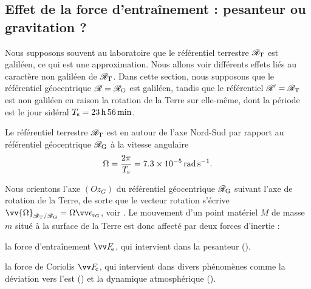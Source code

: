 \documentclass[12pt,fancy]{cours}
\begin{document}
\subsection{Effet de la force d'entraînement : pesanteur ou gravitation ?}
\label{sec:pesanteur_gravité}

Nous supposons souvent au laboratoire que le référentiel terrestre $\mathcal{R}_{\rm T}$ est galiléen, ce qui est une approximation. Nous allons voir différents effets liés au caractère non galiléen de $\mathcal{R}_{\rm T}$. Dans cette section, nous supposons que le référentiel géocentrique $\mathcal{R} = \mathcal{R}_{\rm{G}}$ est galiléen, tandis que le référentiel $\mathcal{R}' = \mathcal{R}_{\rm T}$ est non galiléen en raison la rotation de la Terre sur elle-même, dont la période est le jour sidéral $T_{\rm s}=\SI{23}{h}\,\SI{56}{min}$.

\begin{prop}\label{prop:}
  Le référentiel terrestre $\mathcal{R}_{\rm T}$ est en  autour de l'axe Nord-Sud par rapport au référentiel géocentrique $\mathcal{R}_{\rm{G}}$ à la vitesse angulaire
  \begin{equation*}
  \Omega=\dfrac{2\pi}{T_{\rm{s}}} = \SI{7.3e-5}{rad.s^{-1}}.
\end{equation*}
\end{prop}

Nous orientons l'axe $(Oz_G)$ du référentiel géocentrique $\mathcal{R}_{\rm{G}}$ suivant l'axe de rotation de la Terre, de sorte que le vecteur rotation s'écrive $\vv{\Omega}_{\RT/\RG}=\Omega \Vec{e}_{\!z_G}$, voir . Le mouvement d'un point matériel $M$ de masse $m$ situé à la surface de la Terre est donc affecté par deux forces d'inertie :
\begin{liste}
  \item la force d'entraînement $\Fe$, qui intervient dans la pesanteur ().
  \item la force de Coriolis $\Fc$, qui intervient dans divers phénomènes comme la déviation vers l'est () et la dynamique atmosphérique ().
\end{liste}
 
\end{document}
